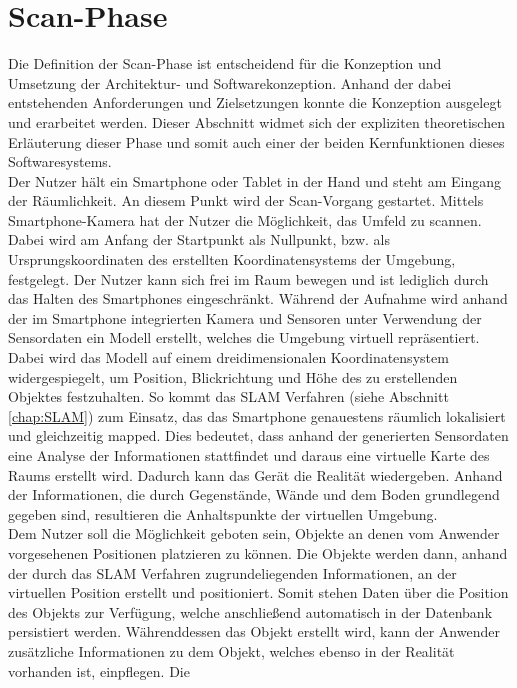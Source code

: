 \section{Scan-Phase}
\label{chap:Scan-Phase} %
Die Definition der Scan-Phase ist entscheidend für die Konzeption und Umsetzung der Architektur- und Softwarekonzeption. 
Anhand der dabei entstehenden Anforderungen und Zielsetzungen konnte die Konzeption ausgelegt und erarbeitet werden. Dieser Abschnitt widmet 
sich der expliziten theoretischen Erläuterung dieser Phase und somit auch einer der beiden Kernfunktionen dieses Softwaresystems.
\\ 
\linebreak
Der Nutzer hält ein Smartphone oder Tablet in der Hand und steht am Eingang der Räumlichkeit. An diesem Punkt wird der Scan-Vorgang gestartet. 
Mittels Smartphone-Kamera hat der Nutzer die Möglichkeit, das Umfeld zu scannen. Dabei wird am Anfang der Startpunkt als Nullpunkt, bzw. 
als Ursprungskoordinaten des erstellten Koordinatensystems der Umgebung, festgelegt. Der Nutzer kann sich frei im Raum bewegen und ist lediglich 
durch das Halten des Smartphones eingeschränkt. Während der Aufnahme wird anhand der im Smartphone integrierten Kamera und 
Sensoren unter Verwendung der Sensordaten ein Modell erstellt, welches die Umgebung virtuell repräsentiert. Dabei wird das Modell auf 
einem dreidimensionalen Koordinatensystem widergespiegelt, um Position, Blickrichtung und Höhe des zu erstellenden Objektes festzuhalten. 
So kommt das \acl{SLAM} Verfahren (siehe Abschnitt \ref{chap:SLAM}) zum Einsatz, das das Smartphone genauestens räumlich lokalisiert und 
gleichzeitig mapped. Dies bedeutet, dass anhand der generierten Sensordaten eine Analyse der Informationen stattfindet und daraus eine 
virtuelle Karte des Raums erstellt wird. Dadurch kann das Gerät die Realität wiedergeben. Anhand der Informationen, die durch
Gegenstände, Wände und dem Boden grundlegend gegeben sind, resultieren die Anhaltspunkte der virtuellen Umgebung. 
\\ 
Dem Nutzer soll die Möglichkeit geboten sein, Objekte an denen vom Anwender vorgesehenen Positionen platzieren zu können. Die Objekte werden 
dann, anhand der durch das \acs{SLAM} Verfahren zugrundeliegenden Informationen, an der virtuellen Position erstellt und positioniert. Somit 
stehen Daten über die Position des Objekts zur Verfügung, welche anschließend automatisch in der Datenbank persistiert werden. Währenddessen das Objekt 
erstellt wird, kann der Anwender zusätzliche Informationen zu dem Objekt, welches ebenso in der Realität vorhanden ist, einpflegen. Die 
